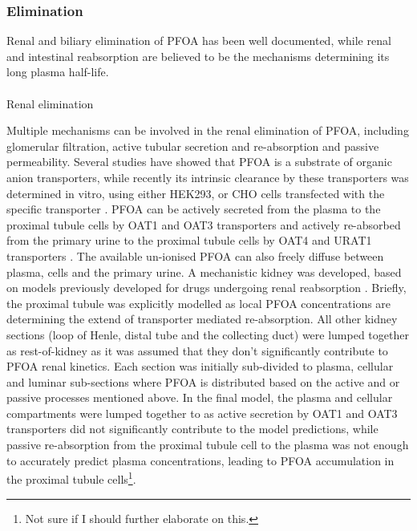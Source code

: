 \documentclass[
  authoryear,
  preprint]{elsarticle}
\makeatletter
\let\oldparagraph\paragraph
\renewcommand{\paragraph}{
    \@ifstar
      \xxxParagraphStar
      \xxxParagraphNoStar
  }
\newcommand{\xxxParagraphStar}[1]{\oldparagraph*{#1}\mbox{}}
\newcommand{\xxxParagraphNoStar}[1]{\oldparagraph{#1}\mbox{}}
\makeatother
\begin{document}
\subsubsection{Elimination}\label{elimination}

Renal and biliary elimination of PFOA has been well documented, while
renal and intestinal reabsorption are believed to be the mechanisms
determining its long plasma half-life.

\paragraph{Renal elimination}\label{renal-elimination}

Multiple mechanisms can be involved in the renal elimination of PFOA,
including glomerular filtration, active tubular secretion and
re-absorption and passive permeability. Several studies have showed that
PFOA is a substrate of organic anion transporters, while recently its
intrinsic clearance by these transporters was determined in vitro, using
either HEK293, or CHO cells transfected with the specific transporter
\citep{yang2010, janssen2024, ryu2024, lin2023}. PFOA can be actively
secreted from the plasma to the proximal tubule cells by OAT1 and OAT3
transporters and actively re-absorbed from the primary urine to the
proximal tubule cells by OAT4 and URAT1 transporters
\citep{yang2010, janssen2024, ryu2024, lin2023}. The available
un-ionised PFOA can also freely diffuse between plasma, cells and the
primary urine. A mechanistic kidney was developed, based on models
previously developed for drugs undergoing renal reabsorption
\citep{scotcher2016, huang2018, pletz2021}. Briefly, the proximal tubule
was explicitly modelled as local PFOA concentrations are determining the
extend of transporter mediated re-absorption. All other kidney sections
(loop of Henle, distal tube and the collecting duct) were lumped
together as rest-of-kidney as it was assumed that they don't
significantly contribute to PFOA renal kinetics. Each section was
initially sub-divided to plasma, cellular and luminar sub-sections where
PFOA is distributed based on the active and or passive processes
mentioned above. In the final model, the plasma and cellular
compartments were lumped together to as active secretion by OAT1 and
OAT3 transporters did not significantly contribute to the model
predictions, while passive re-absorption from the proximal tubule cell
to the plasma was not enough to accurately predict plasma
concentrations, leading to PFOA accumulation in the proximal tubule
cells\footnote{Not sure if I should further elaborate on this.}.
\end{document}
